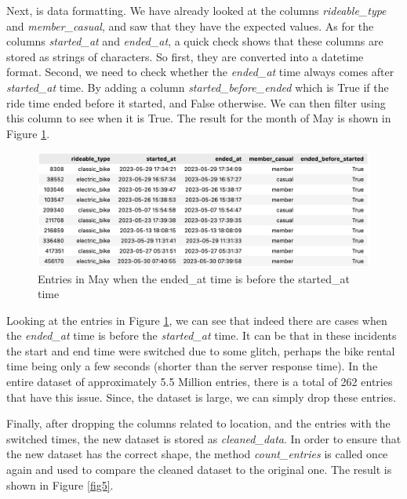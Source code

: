 \documentclass[12pt]{article}
\begin{document}
\begin{itemize}
Next, is data formatting. We have already looked at the columns \textit{rideable\_type} and \textit{member\_casual}, and saw that they have the expected values. As for the columns \textit{started\_at} and \textit{ended\_at}, a quick check shows that these columns are stored as strings of characters. So first, they are converted into a datetime format. Second, we need to check whether the \textit{ended\_at} time always comes after \textit{started\_at} time. By adding a column \textit{started\_before\_ended} which is True if the ride time ended before it started, and False otherwise. We can then filter using this column to see when it is True. The result for the month of May is shown in Figure \ref{fig8}.

	\begin{figure}[h]
	\centering
	\includegraphics[scale=0.6]{imgNEG.png}
	\caption{Entries in May when the ended\_at time is before the started\_at time}
	\label{fig8}
	\end{figure}

Looking at the entries in Figure \ref{fig8}, we can see that indeed there are cases when the \textit{ended\_at} time is before the \textit{started\_at} time. It can be that in these incidents the start and end time were switched due to some glitch, perhaps the bike rental time being only a few seconds (shorter than the server response time). In the entire dataset of approximately 5.5 Million entries, there is a total of 262 entries that have this issue. Since, the dataset is large, we can simply drop these entries.


Finally, after dropping the columns related to location, and the entries with the switched times, the new dataset is stored as \textit{cleaned\_data}. In order to ensure that the new dataset has the correct shape, the method \textit{count\_entries} is called once again and used to compare the cleaned dataset to the original one. The result is shown in Figure \ref{fig5}.
	

\end{itemize}
\end{document}
